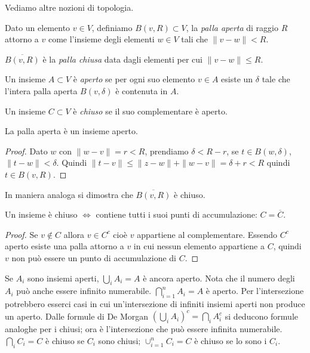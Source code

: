 Vediamo altre nozioni di topologia.\\
\begin{definition}
Dato un elemento $v \in V$, definiamo $B(v,R) \subset V$, la \emph{palla aperta}
di raggio $R$ attorno a $v$ come l'insieme degli elementi $w \in V$ tali
che $\|v-w\| < R$. 
\end{definition}

\begin{definition}
$\overline{B(v,R)}$ è la \emph{palla chiusa} data dagli elementi
per cui $\|v-w\| \leq R$.
\end{definition}

\begin{definition}[aperto]
Un insieme $A \subset V$ è \emph{aperto} se per ogni suo elemento $v\in A$
esiste un $\delta$ tale che l'intera palla aperta $B(v, \delta)$ è contenuta
in $A$.
\end{definition}

\begin{definition}[chiuso]
Un insieme $C \subset V$ è \emph{chiuso} se il suo complementare è aperto.
\end{definition}

\begin{theorem}
La palla aperta è un insieme aperto.
\end{theorem}
\begin{proof}
Dato $w$ con $\|w-v\|=r<R$, prendiamo
$\delta < R-r$, se $t \in B(w, \delta)$, $\|t-w\| < \delta$. Quindi $\|t-v\|
\leq \|z-w\| + \|w-v\| = \delta +r < R$ quindi $t \in B(v,R)$. 
\end{proof}
In maniera analoga si dimostra che $\overline{B(v,R)}$ è chiuso.
\begin{theorem}
Un insieme è chiuso $\iff$ contiene tutti i suoi punti di accumulazione:
$C = \overline{C}$.
\end{theorem}
\begin{proof}
Se $v \notin C$ allora $v \in C^c$ cioè $v$ appartiene al
complementare. Essendo $C^c$ aperto esiste una palla attorno a $v$ in cui
nessun elemento appartiene a $C$, quindi $v$ non può essere un punto di
accumulazione di $C$.
\end{proof}
Se $A_i$ sono insiemi aperti, $\bigcup_i A_i = A$ è ancora aperto. Nota che
il numero degli $A_i$ può anche essere infinito numerabile. 
$\bigcap_{i = 1}^n A_i = A$ è aperto. Per l'intersezione potrebbero esserci
casi in cui un'intersezione di infiniti insiemi aperti non produce un aperto.
Dalle formule di De Morgan $(\bigcup_i A_i)^c = \bigcap_i A_i^c$ si deducono
formule analoghe per i chiusi; ora è l'intersezione che può essere infinita
numerabile. $\bigcap_i C_i = C$ è chiuso se $C_i$ sono chiusi; 
$\cup_{i=1}^n C_i = C$ è chiuso se lo sono i $C_i$.

